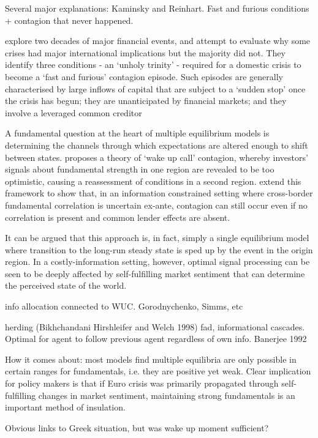 \documentclass[../base.tex]{subfiles}
\begin{document}
Several major explanations: 
Kaminsky and Reinhart. Fast and furious conditions + contagion that never happened.

\cite{kaminsky2003unholy} explore two decades of major financial events, and attempt to evaluate why some crises had major international implications but the majority did not. They identify three conditions - an `unholy trinity' - required for a domestic crisis to become a `fast and furious' contagion episode. Such episodes are generally characterised by large inflows of capital that are subject to a `sudden stop' once the crisis has begun; they are unanticipated by financial markets; and they involve a leveraged common creditor 

A fundamental question at the heart of multiple equilibrium models is determining the channels through which expectations are altered enough to shift between states. \cite{goldstein1998asian} proposes a theory of `wake up call' contagion, whereby investors' signals about fundamental strength in one region are revealed to be too optimistic, causing a reassessment of conditions in a second region. \cite{ahnert2015wake} extend this framework to show that, in an information constrained setting where cross-border fundamental correlation is uncertain ex-ante, contagion can still occur even if no correlation is present and common lender effects are absent. 

It can be argued that this approach is, in fact, simply a single equilibrium model where transition to the long-run steady state is sped up by the event in the origin region. In a costly-information setting, however, optimal signal processing can be seen to be deeply affected by self-fulfilling market sentiment that can determine the perceived state of the world.

info allocation connected to WUC. Gorodnychenko, Simms, etc

herding (Bikhchandani Hirshleifer and Welch 1998) fad, informational cascades. Optimal for agent to follow previous agent regardless of own info. Banerjee 1992

How it comes about: most models find multiple equilibria are only possible in certain ranges for fundamentals, i.e. they are positive yet weak. Clear implication for policy makers is that if Euro crisis was primarily propagated through self-fulfilling changes in market sentiment, maintaining strong fundamentals is an important method of insulation. 


Obvious links to Greek situation, but was wake up moment sufficient?
\end{document}
